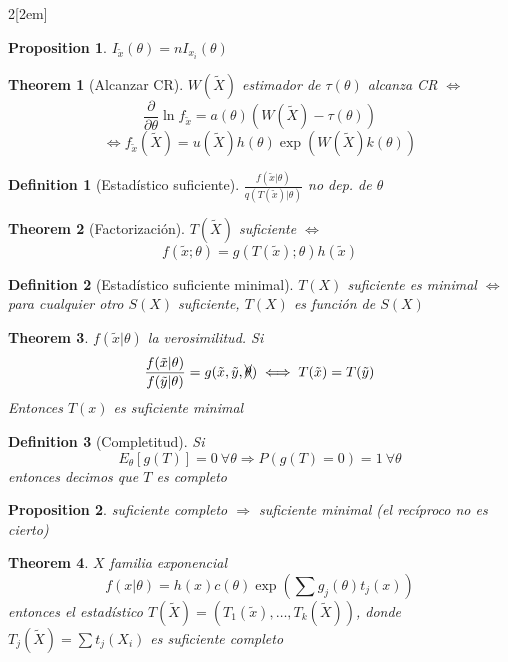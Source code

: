 \documentclass[leqno]{article}
\newtheorem*{theorem}{Theorem}
\newtheorem*{proposition}{Proposition}
\newtheorem*{definition}{Definition}
\begin{document}
\begin{multicols}{2}[\columnsep2em]
\begin{proposition} $I_{\tilde{x}}(\theta ) = nI_{x_i}(\theta )$
\end{proposition}

\begin{theorem}[Alcanzar CR] $W(\tilde{X})$ estimador de $\tau (\theta )$ alcanza CR  $\iff$
\[
\frac{\partial}{\partial \theta } \ln f_{\tilde{x}} = a(\theta )(W(\tilde{X})-\tau (\theta ))
\] 
\[\iff f_{\tilde{x}}(\tilde X) = u(\tilde X)h(\theta) \exp (W(\tilde{X}) k(\theta))\]
\end{theorem}

\begin{definition}[Estadístico suficiente] $\frac{f(\tilde{x}|\theta )}{q(T(\tilde{x})|\theta )}$ no dep. de $\theta $
\end{definition}

\begin{theorem}[Factorización] $T(\tilde{X})$ suficiente $\iff$ 
\[
f(\tilde{x}; \theta ) = g(T(\tilde{x});\theta )h(\tilde{x})
\] 
\end{theorem}

\begin{definition}[Estadístico suficiente minimal] $T(X)$ suficiente es minimal  $\iff$ para cualquier otro $S(X)$ suficiente,  $T(X)$ es función de $S(X)$ 
\end{definition}

\begin{theorem} $f(\tilde{x}|\theta )$ la verosimilitud. Si 
  \[
  \frac{f(\tilde{x}|\theta)}{f(\tilde{y}|\theta)} = g(\tilde x, \tilde y, \xcancel \theta) \iff T(\tilde{x}) = T(\tilde{y})
  \] 
  Entonces $T(x)$ es suficiente minimal
\end{theorem}

\begin{definition}[Completitud] Si
   \[
	 E_\theta [g(T)] = 0 \ \forall \theta \Rightarrow P(g(T)=0)=1 \ \forall \theta 
  \] 
  entonces decimos que $T$ es completo
\end{definition}

\begin{proposition}
suficiente completo $\Rightarrow$ suficiente minimal (el recíproco no es cierto)
\end{proposition}

\begin{theorem}$X$ familia exponencial 
\[
f(x|\theta ) = h(x)c(\theta ) \exp(\sum g_j(\theta) t_j(x))
\] 
entonces el estadístico $T(\tilde{X}) = (T_1(\tilde{x}), \ldots, T_k(\tilde{X}))$, donde $T_j(\tilde{X}) = \sum t_j(X_i)$ es suficiente completo
\end{theorem}


\end{multicols}
\end{document}

